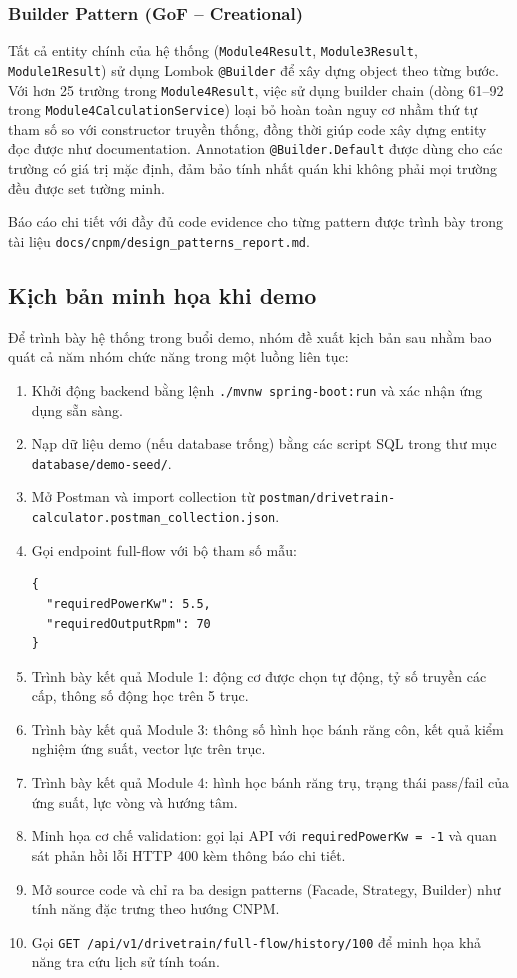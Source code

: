 \documentclass[a4paper]{article}
\begin{document}
\subsubsection{Builder Pattern (GoF -- Creational)}

Tất cả entity chính của hệ thống (\texttt{Module4Result}, \texttt{Module3Result}, \texttt{Module1Result}) sử dụng Lombok \texttt{@Builder} để xây dựng object theo từng bước. Với hơn 25 trường trong \texttt{Module4Result}, việc sử dụng builder chain (dòng 61--92 trong \texttt{Module4CalculationService}) loại bỏ hoàn toàn nguy cơ nhầm thứ tự tham số so với constructor truyền thống, đồng thời giúp code xây dựng entity đọc được như documentation. Annotation \texttt{@Builder.Default} được dùng cho các trường có giá trị mặc định, đảm bảo tính nhất quán khi không phải mọi trường đều được set tường minh.

\vspace{0.3cm}
\noindent Báo cáo chi tiết với đầy đủ code evidence cho từng pattern được trình bày trong tài liệu \texttt{docs/cnpm/design\_patterns\_report.md}.

\subsection{Kịch bản minh họa khi demo}

Để trình bày hệ thống trong buổi demo, nhóm đề xuất kịch bản sau nhằm bao quát cả năm nhóm chức năng trong một luồng liên tục:

\begin{enumerate}
\item Khởi động backend bằng lệnh \texttt{./mvnw spring-boot:run} và xác nhận ứng dụng sẵn sàng.
\item Nạp dữ liệu demo (nếu database trống) bằng các script SQL trong thư mục \texttt{database/demo-seed/}.
\item Mở Postman và import collection từ \texttt{postman/drivetrain-calculator.postman\_collection.json}.
\item Gọi endpoint full-flow với bộ tham số mẫu:
\begin{lstlisting}[basicstyle=\ttfamily\small,frame=single]
{
  "requiredPowerKw": 5.5,
  "requiredOutputRpm": 70
}
\end{lstlisting}
\item Trình bày kết quả Module 1: động cơ được chọn tự động, tỷ số truyền các cấp, thông số động học trên 5 trục.
\item Trình bày kết quả Module 3: thông số hình học bánh răng côn, kết quả kiểm nghiệm ứng suất, vector lực trên trục.
\item Trình bày kết quả Module 4: hình học bánh răng trụ, trạng thái pass/fail của ứng suất, lực vòng và hướng tâm.
\item Minh họa cơ chế validation: gọi lại API với \texttt{requiredPowerKw = -1} và quan sát phản hồi lỗi HTTP 400 kèm thông báo chi tiết.
\item Mở source code và chỉ ra ba design patterns (Facade, Strategy, Builder) như tính năng đặc trưng theo hướng CNPM.
\item Gọi \texttt{GET /api/v1/drivetrain/full-flow/history/100} để minh họa khả năng tra cứu lịch sử tính toán.
\end{enumerate}
\end{document}
